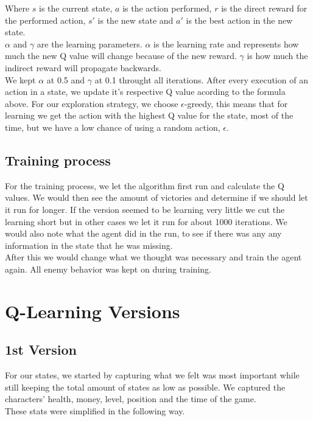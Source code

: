 \documentclass{article}
\begin{document}
  \noindent
  Where $s$ is the current state, $a$ is the action performed, $r$ is the direct reward for the performed action,
  $s'$ is the new state and $a'$ is the best action in the new state.\\
  $\alpha$ and $\gamma$ are the learning parameters.
  $\alpha$ is the learning rate and represents how much the new Q value will change because of the new reward.
  $\gamma$ is how much the indirect reward will propagate backwards.\\
  We kept $\alpha$ at 0.5 and $\gamma$ at 0.1 throught all iterations.
  \noindent
  After every execution of an action in a state, we update it's respective Q value acording to the formula above. 
  For our exploration strategy, we choose $\epsilon$-greedy, this means that for learning we get the action with the highest Q value for
  the state, most of the time, but we have a low chance of using a random action, $\epsilon$.\\
  
  \subsection{Training process}
  For the training process, we let the algorithm first run and calculate the Q values.
  We would then see the amount of victories and determine if we should let it run for longer. If the version seemed to be learning very little
  we cut the learning short but in other cases we let it run for about 1000 iterations.
  We would also note what the agent did in the run, to see if there was any any information
  in the state that he was missing.\\
  After this we would change what we thought was necessary and train the agent again. All enemy behavior was kept on during training.

  \section{Q-Learning Versions}
  \subsection{1st Version}
  For our states, we started by capturing what we felt was most important while still keeping the total amount of states as low as possible.
  We captured the characters' health, money, level, position and the time of the game.\\
  These stats were simplified in the following way.\\
\end{document}

